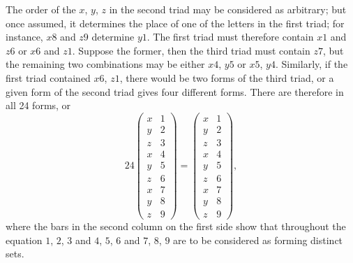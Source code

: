 \documentclass[11pt,a4paper]{article}
\theoremstyle{plain}
\begin{document}
The order of the $x$, $y$, $z$ in the second triad may be considered as arbitrary; but once assumed, it determines the place of one of the letters in the first triad; for instance, $x8$ and $z9$ determine $y1$. The first triad must therefore contain $x1$ and $z6$ or $x6$ and $z1$. Suppose the former, then the third triad must contain $z7$, but the remaining two combinations may be either $x4$, $y5$ or $x5$, $y4$. Similarly, if the first triad contained $x6$, $z1$, there would be two forms of the third triad, or a given form of the second triad gives four different forms. There are therefore in all 24 forms, or
\[24 \begin{pmatrix} x & 1 \\ y & 2 \\ z & 3 \\ \hline x & 4 \\ y & 5 \\ z & 6 \\ \hline x & 7 \\ y & 8 \\ z & 9 \end{pmatrix} = \begin{pmatrix} x & 1 \\ y & 2 \\ z & 3 \\ \hline x & 4 \\ y & 5 \\ z & 6 \\ \hline x & 7 \\ y & 8 \\ z & 9 \end{pmatrix},\]
where the bars in the second column on the first side show that throughout the equation $1$, $2$, $3$ and $4$, $5$, $6$ and $7$, $8$, $9$ are to be considered as forming distinct sets.
\end{document}
